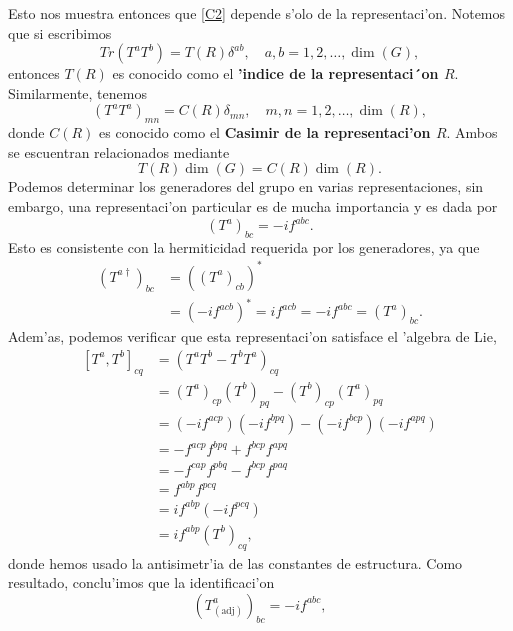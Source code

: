 Esto nos muestra entonces que \eqref{C2} depende s'olo de la representaci'on. Notemos que si escribimos
\begin{equation}
Tr(T^aT^b)=T(R)\delta^{ab}, \quad a,b=1,2,\ldots,\dim (G),
\end{equation} 
entonces $T(R)$ es conocido como el \textbf{'indice de la representaci´on $R$}. Similarmente, tenemos
\begin{equation}
(T^aT^a)_{mn}=C(R)\delta_{mn}, \quad m,n=1,2,\ldots,\dim (R),
\end{equation}
donde $C(R)$ es conocido como el \textbf{Casimir de la representaci'on $R$}. Ambos se escuentran relacionados mediante
\begin{equation}
T(R)\dim (G) = C(R) \dim (R).
\end{equation}
Podemos determinar los generadores del grupo en varias representaciones, sin embargo, una representaci'on particular es de mucha importancia y es dada por
\begin{equation}
(T^a)_{bc}=-if^{abc}.
\end{equation}
Esto es consistente con la hermiticidad requerida por los generadores, ya que
\begin{equation}
\begin{aligned}
(T^{a \dagger})_{bc}&=((T^a)_{cb})^* \\
&=(-if^{acb})^*=if^{acb}=-if^{abc}=(T^a)_{bc}.
\end{aligned}
\end{equation}
Adem'as, podemos verificar que esta representaci'on satisface el 'algebra de Lie,
\begin{equation}
\begin{aligned}
\left[T^a,T^b\right]_{cq}&=(T^aT^b-T^bT^a)_{cq} \\
&=(T^a)_{cp}(T^b)_{pq}-(T^b)_{cp}(T^a)_{pq} \\
&=(-if^{acp})(-if^{bpq})-(-if^{bcp})(-if^{apq}) \\
&=-f^{acp}f^{bpq}+f^{bcp}f^{apq} \\
&=-f^{cap}f^{pbq}-f^{bcp}f^{paq} \\
&=f^{abp}f^{pcq} \\
&=if^{abp}(-if^{pcq}) \\
&=if^{abp}(T^b)_{cq},
\end{aligned}
\end{equation}
donde hemos usado la antisimetr'ia de las constantes de estructura. Como resultado, conclu'imos que la identificaci'on
\begin{equation}
(T^a_{(\text{adj})})_{bc}=-if^{abc},
\end{equation}

